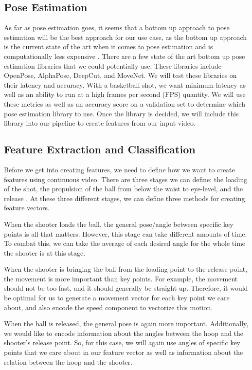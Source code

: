 \documentclass[10pt,twocolumn,letterpaper]{article}
\begin{document}
\subsection{Pose Estimation}
As far as pose estimation goes, it seems that a bottom up approach to pose estimation will be the best approach for our use case, as the bottom up approach is the
current state of the art when it comes to pose estimation and is computationally less expensive \cite{Datagen}. There are a few state of the art bottom up pose estimation libraries that we could potentially use. These
libraries include OpenPose, AlphaPose, DeepCut, and MoveNet. We will test these libraries on their latency and accuracy. With a basketball shot, we want minimum latency
as well as an ability to run at a high frames per second (FPS) quantity. We will use these metrics as well as an accuracy score on a validation set to determine which pose
estimation library to use. Once the library is decided, we will include this library into our pipeline to create features from our input video.

\subsection{Feature Extraction and Classification}
Before we get into creating features, we need to define how we want to create features using continuous video. There are three stages we can define: the loading of the shot, the propulsion of the ball from below the waist
to eye-level, and the release \cite{FreeThrow}. At these three different stages, we can define three methods for creating feature vectors.

When the shooter loads the ball, the general pose/angle between specific key points is all that matters. However, this stage can take different amounts of time. To combat this,
we can take the average of each desired angle for the whole time the shooter is at this stage.

When the shooter is bringing the ball from the loading point to the release point, the movement is more important than key points. For example, the movement should not be too fast, and it should generally be straight up.
Therefore, it would be optimal for us to generate a movement vector for each key point we care about, and also encode the speed component to vectorize this motion.

When the ball is released, the general pose is again more important. Additionally, we would like to encode information about the angles between the hoop and the shooter's release point. So, for this case, we
will again use angles of specific key points that we care about in our feature vector as well as information about the relation between the hoop and the shooter.
\end{document}
